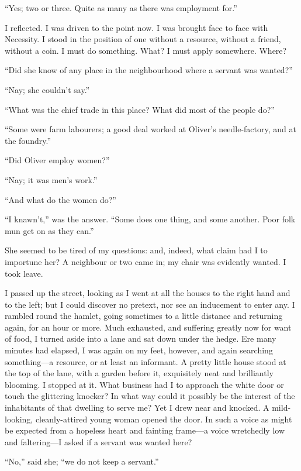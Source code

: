 \enquote{Yes; two or three. Quite as many as there was employment for.}

I reflected. I was driven to the point now. I was brought face to face
with Necessity. I stood in the position of one without a resource,
without a friend, without a coin. I must do something. What? I must
apply somewhere. Where?

\enquote{Did she know of any place in the neighbourhood where a servant
	was wanted?}

\enquote{Nay; she couldn't say.}

\enquote{What was the chief trade in this place? What did most of the
	people do?}

\enquote{Some were farm labourers; a good deal worked at \Mr{} Oliver's
	needle-factory, and at the foundry.}

\enquote{Did \Mr{} Oliver employ women?}

\enquote{Nay; it was men's work.}

\enquote{And what do the women do?}

\enquote{I knawn't,} was the answer. \enquote{Some does one thing, and
	some another. Poor folk mun get on as they can.}

She seemed to be tired of my questions: and, indeed, what claim had I to
importune her? A neighbour or two came in; my chair was evidently
wanted. I took leave.

I passed up the street, looking as I went at all the houses to the right
hand and to the left; but I could discover no pretext, nor see an
inducement to enter any. I rambled round the hamlet, going sometimes to
a little distance and returning again, for an hour or more. Much
exhausted, and suffering greatly now for want of food, I turned aside
into a lane and sat down under the hedge. Ere many minutes had elapsed,
I was again on my feet, however, and again searching something---a
resource, or at least an informant. A pretty little house stood at the
top of the lane, with a garden before it, exquisitely neat and
brilliantly blooming. I stopped at it. What business had I to approach
the white door or touch the glittering knocker? In what way could it
possibly be the interest of the inhabitants of that dwelling to serve
me? Yet I drew near and knocked. A mild-looking, cleanly-attired young
woman opened the door. In such a voice as might be expected from a
hopeless heart and fainting frame---a voice wretchedly low and
faltering---I asked if a servant was wanted here?

\enquote{No,} said she; \enquote{we do not keep a servant.}


